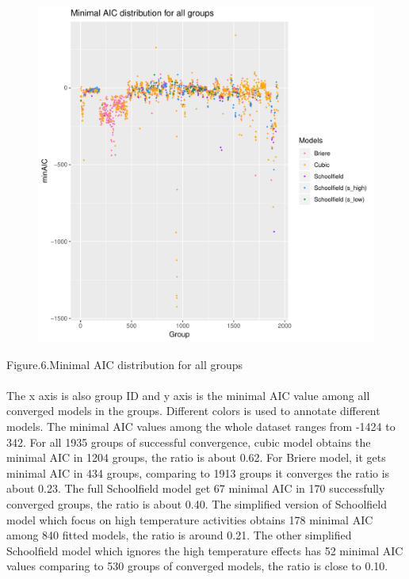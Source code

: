 \documentclass[12pt,a4paper]{article}
\begin{document}
\begin{figure}[H]
\centering
\includegraphics[width=\textwidth]{model_AIC.pdf}
\end{figure}
Figure.6.Minimal AIC distribution for all groups
\\
\\
The x axis is also group ID and y axis is the minimal AIC value among all converged models in the groups. Different colors is used to annotate different models. The minimal AIC values among the whole dataset ranges from -1424 to 342. For all 1935 groups of successful convergence, cubic model obtains the minimal AIC in 1204 groups, the ratio is about 0.62. For Briere model, it gets minimal AIC in 434 groups, comparing to 1913 groups it converges the ratio is about 0.23. The full Schoolfield model get 67 minimal AIC in 170 successfully converged groups, the ratio is about 0.40. The simplified version of Schoolfield model which focus on high temperature activities obtains 178 minimal AIC among 840 fitted models, the ratio is around 0.21. The other simplified Schoolfield model which ignores the high temperature effects has 52 minimal AIC values comparing to 530 groups of converged models, the ratio is close to 0.10.
\end{document}
